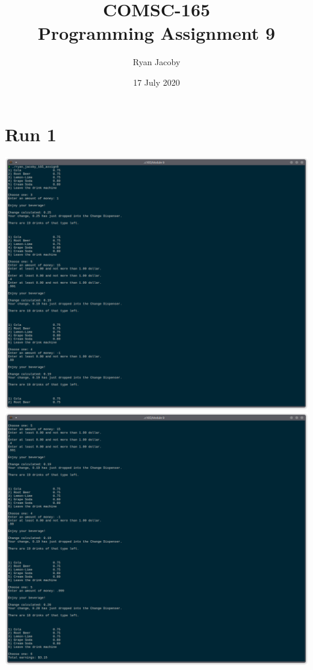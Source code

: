 \documentclass[letterpaper, 11pt]{article}
\title{COMSC-165 \\ Programming Assignment 9}
\author{Ryan Jacoby}
\date{17 July 2020}
\begin{document}
\maketitle

\section*{Run 1}
\includegraphics[scale=0.5]{run1_1.png} 
\clearpage
\includegraphics[scale=0.5]{run1_2.png}
\clearpage
\end{document}
